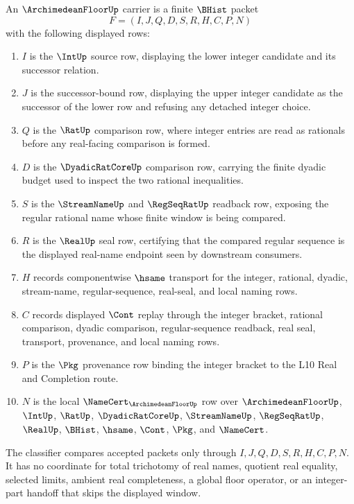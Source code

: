 \begin{definition}
\label{def:archimedean-floor-carrier}
An $\ArchimedeanFloorUp$ carrier is a finite $\BHist$ packet
$$
F=(I,J,Q,D,S,R,H,C,P,N)
$$
with the following displayed rows:
\begin{enumerate}
\item $I$ is the $\IntUp$ source row, displaying the lower integer candidate and its successor relation.
\item $J$ is the successor-bound row, displaying the upper integer candidate as the successor of the lower row and refusing any detached integer choice.
\item $Q$ is the $\RatUp$ comparison row, where integer entries are read as rationals before any real-facing comparison is formed.
\item $D$ is the $\DyadicRatCoreUp$ comparison row, carrying the finite dyadic budget used to inspect the two rational inequalities.
\item $S$ is the $\StreamNameUp$ and $\RegSeqRatUp$ readback row, exposing the regular rational name whose finite window is being compared.
\item $R$ is the $\RealUp$ seal row, certifying that the compared regular sequence is the displayed real-name endpoint seen by downstream consumers.
\item $H$ records componentwise $\hsame$ transport for the integer, rational, dyadic, stream-name, regular-sequence, real-seal, and local naming rows.
\item $C$ records displayed $\Cont$ replay through the integer bracket, rational comparison, dyadic comparison, regular-sequence readback, real seal, transport, provenance, and local naming rows.
\item $P$ is the $\Pkg$ provenance row binding the integer bracket to the L10 Real and Completion route.
\item $N$ is the local $\NameCert_{\ArchimedeanFloorUp}$ row over $\ArchimedeanFloorUp$, $\IntUp$, $\RatUp$, $\DyadicRatCoreUp$, $\StreamNameUp$, $\RegSeqRatUp$, $\RealUp$, $\BHist$, $\hsame$, $\Cont$, $\Pkg$, and $\NameCert$.
\end{enumerate}
The classifier compares accepted packets only through $I,J,Q,D,S,R,H,C,P,N$. It has no coordinate for total trichotomy of real names, quotient real equality, selected limits, ambient real completeness, a global floor operator, or an integer-part handoff that skips the displayed window.
\end{definition}

